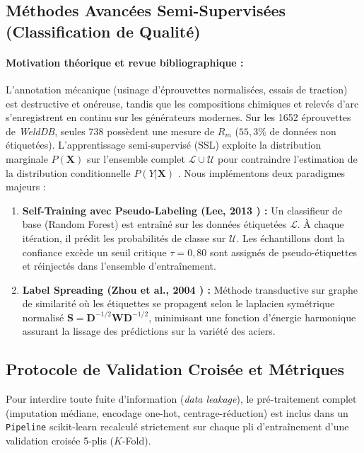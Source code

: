 \documentclass[11pt,a4paper]{article}
\begin{document}
\subsection{Méthodes Avancées Semi-Supervisées (Classification de Qualité)}
\paragraph{Motivation théorique et revue bibliographique :}
L'annotation mécanique (usinage d'éprouvettes normalisées, essais de traction) est destructive et onéreuse, tandis que les compositions chimiques et relevés d'arc s'enregistrent en continu sur les générateurs modernes. Sur les 1652 éprouvettes de \textit{WeldDB}, seules 738 possèdent une mesure de $R_m$ ($55{,}3\%$ de données non étiquetées). L'apprentissage semi-supervisé (SSL) exploite la distribution marginale $P(\mathbf{X})$ sur l'ensemble complet $\mathcal{L} \cup \mathcal{U}$ pour contraindre l'estimation de la distribution conditionnelle $P(Y|\mathbf{X})$ \cite{chapelle2006}. Nous implémentons deux paradigmes majeurs :
\begin{enumerate}
    \item \textbf{Self-Training avec Pseudo-Labeling (Lee, 2013 \cite{lee2013}) :} Un classifieur de base (Random Forest) est entraîné sur les données étiquetées $\mathcal{L}$. À chaque itération, il prédit les probabilités de classe sur $\mathcal{U}$. Les échantillons dont la confiance excède un seuil critique $\tau = 0{,}80$ sont assignés de pseudo-étiquettes et réinjectés dans l'ensemble d'entraînement.
    \item \textbf{Label Spreading (Zhou et al., 2004 \cite{zhou2004}) :} Méthode transductive sur graphe de similarité où les étiquettes se propagent selon le laplacien symétrique normalisé $\mathbf{S} = \mathbf{D}^{-1/2} \mathbf{W} \mathbf{D}^{-1/2}$, minimisant une fonction d'énergie harmonique assurant la lissage des prédictions sur la variété des aciers.
\end{enumerate}

\subsection{Protocole de Validation Croisée et Métriques}
Pour interdire toute fuite d'information (\textit{data leakage}), le pré-traitement complet (imputation médiane, encodage one-hot, centrage-réduction) est inclus dans un \texttt{Pipeline} scikit-learn recalculé strictement sur chaque pli d'entraînement d'une validation croisée 5-plis ($K$-Fold). 
\end{document}
